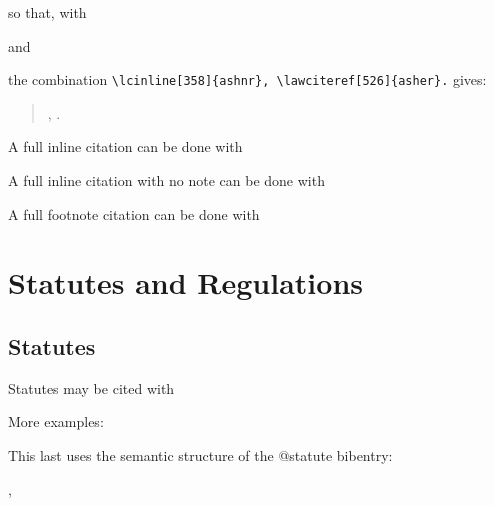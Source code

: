 so that, with
\begin{quotation}\noindent
{}
\end{quotation}
and
\begin{quotation}\noindent
{}
\end{quotation}
the combination \verb|\lcinline[358]{ashnr}, \lawciteref[526]{asher}.| gives:
\begin{quotation}\noindent
{}, .
\end{quotation}





\p A full inline citation can be done with \\ 

\p A full inline citation with no note can be done with \\ 

\p A full footnote citation can be done with \\ 

\section{Statutes and Regulations}
\subsection{Statutes}

\p Statutes may be cited with 


More examples:

\bigskip
{}\par\bigskip
{}\par\bigskip
{}\par\bigskip

This last uses the semantic structure of the @statute bibentry:\medskip

,   \medskip

